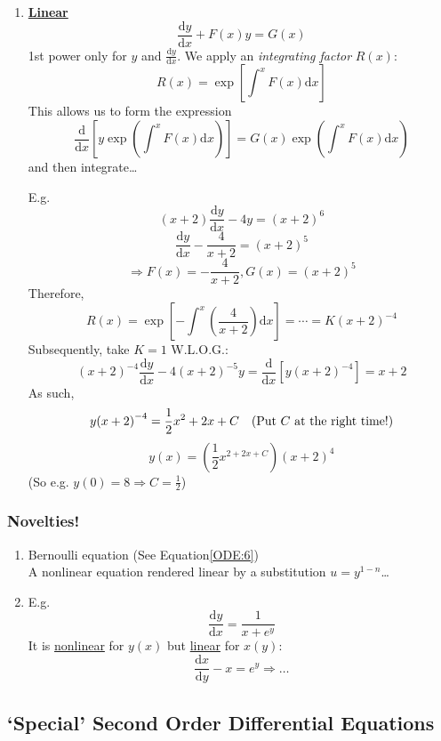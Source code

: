 \documentclass[12pt]{report}
\theoremstyle{definition}
\begin{document}
\begin{enumerate}[label = (\alph*)]
\item \textbf{\underline{Linear}} \[
        \frac{\mathrm{d}y}{\mathrm{d}x} + F(x)y = G(x)
        \]
        1st power only for $y$ and $\frac{\mathrm{d}y}{\mathrm{d}x} $.
        We apply an \emph{integrating factor} $R(x)$: \[
R(x) = \exp{\left[\int_{}^{x} F(x)\mathrm{d}x\right] }
\] This allows us to form the expression\[
\frac{\mathrm{d}}{\mathrm{d}x} \left[y \exp{\left(\int_{}^{x} F(x)\mathrm{d}x\right) }\right] 
= G(x) \exp{\left(\int_{}^{x} F(x)\mathrm{d}x\right) }
\]and then integrate\ldots

E.g. \[
    (x+2) \frac{\mathrm{d}y}{\mathrm{d}x} - 4y = {(x+2)}^{6}
\]\[
\frac{\mathrm{d}y}{\mathrm{d}x} - \frac{4}{x+2} = {(x + 2)}^{5}
\]\[
\Rightarrow F(x) = -\frac{4}{x+2}, G(x) = {(x + 2)}^{5}
\]Therefore,\[
R(x) = \exp{\left[-\int_{}^{x} \left(\frac{4}{x+2}\right) \mathrm{d}x\right] }
= \cdots = K{(x+2)}^{-4}
\]Subsequently, take $K = 1$ W.L.O.G.:\[
{(x+2)}^{-4}\frac{\mathrm{d}y}{\mathrm{d}x} - 4{(x+2)}^{-5} y
= \frac{\mathrm{d}}{\mathrm{d}x} \left[y{(x+2)}^{-4}\right] = x + 2
\]As such,\[
y{(x + 2)}^{-4} = \frac{1}{2}x^{2} + 2x + C \quad \textnormal{(Put $C$ at the right time!)}
\]\[
y(x) = \left(\frac{1}{2}x^{2 + 2x + C}\right) {(x + 2)}^{4}
\]
(So e.g. $y(0) = 8 \Rightarrow C = \frac{1}{2}$)
\end{enumerate}

\subsubsection{Novelties!}

\begin{enumerate}[label = (\roman*)]
    \item Bernoulli equation (See Equation\eqref{ODE:6})
        \\A nonlinear equation rendered linear by a substitution $u = y^{1-n}$\ldots

    \item E.g.\[
        \frac{\mathrm{d}y}{\mathrm{d}x} = \frac{1}{x + e^{y}}
    \]It is \underline{nonlinear} for $y(x)$ but \underline{linear}  for $x(y)$:\[
        \frac{\mathrm{d}x}{\mathrm{d}y} - x = e^{y} \Rightarrow \ldots
    \]
\end{enumerate}

\subsection{`Special' Second Order Differential Equations}
\end{document}
